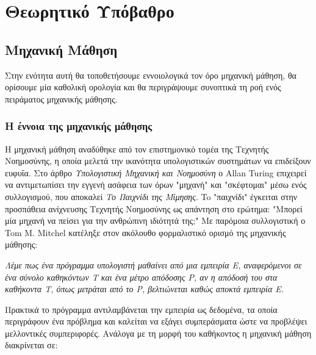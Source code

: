 \chapter{Θεωρητικό Υπόβαθρο}	
\section{Μηχανική Μάθηση}
Στην ενότητα αυτή θα τοποθετήσουμε εννοιολογικά τον όρο μηχανική μάθηση, θα ορίσουμε μία καθολική ορολογία και θα περιγράψουμε συνοπτικά τη ροή ενός πειράματος μηχανικής μάθησης.

\subsection{Η έννοια της μηχανικής μάθησης}
Η μηχανική μάθηση αναδύθηκε από τον επιστημονικό τομέα της Τεχνητής Νοημοσύνης, η οποία μελετά την ικανότητα υπολογιστικών συστημάτων να επιδείξουν ευφυΐα. Στο άρθρο \textit{Υπολογιστική Μηχανική και Νοημοσύνη} \citep{Turing:1995:CMI:216408.216410} ο Allan Turing επιχειρεί να αντιμετωπίσει την εγγενή ασάφεια των όρων "μηχανή" και "σκέφτομαι" μέσω ενός συλλογισμού, που αποκαλεί \textit{Το Παιχνίδι της Μίμησης}. To "παιχνίδι" έγκειται στην προσπάθεια ανίχνευσης Τεχνητής Νοημοσύνης ως απάντηση στο ερώτημα: "Μπορεί μία μηχανή να πείσει για την ανθρώπινη ιδιότητά της;" Με παρόμοια συλλογιστική ο Tom M. Mitchel \citep{Mitchell:1997:ML:541177} κατέληξε στον ακόλουθο φορμαλιστικό ορισμό της μηχανικής μάθησης: 

\begin{displayquote}
	\textit{
	Λέμε πως ένα πρόγραμμα υπολογιστή μαθαίνει από μια εμπειρία \textit{Ε}, αναφερόμενοι σε ένα σύνολο καθηκόντων \textit{Τ} και ένα μέτρο απόδοσης \textit{P}, αν η απόδοσή του στα καθήκοντα \textit{T}, όπως μετράται από το \textit{P}, βελτιώνεται καθώς αποκτά εμπειρία \textit{Ε}. }
\end{displayquote}

Πρακτικά το πρόγραμμα αντιλαμβάνεται την εμπειρία ως δεδομένα, τα οποία περιγράφουν ένα πρόβλημα και καλείται να εξάγει συμπεράσματα ώστε να προβλέψει μελλοντικές συμπεριφορές. Ανάλογα με τη μορφή του καθήκοντος η μηχανική μάθηση διακρίνεται σε:


